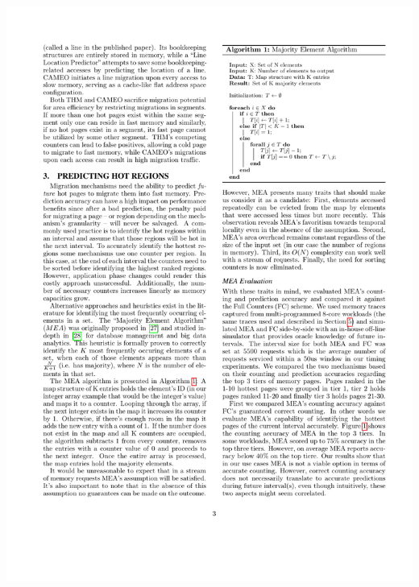 

\setlength{\textfloatsep}{5pt}
\begin{algorithm}[t]
\centering
% 
% 
 \includegraphics[scale=0.95]{figures/mea_algorithm.pdf}
 \label{alg:mea}
\end{algorithm}

